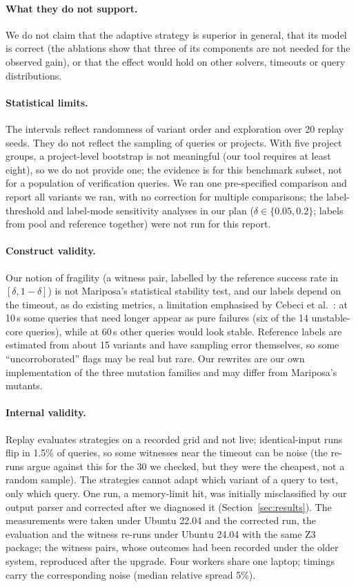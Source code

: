 \documentclass[11pt]{article}
\begin{document}
\paragraph{What they do not support.} We do not claim that the adaptive strategy is superior in general, that its model is correct (the ablations show that three of its components are not needed for the observed gain), or that the effect would hold on other solvers, timeouts or query distributions.

\paragraph{Statistical limits.} The intervals reflect randomness of variant order and exploration over 20 replay seeds. They do not reflect the sampling of queries or projects. With five project groups, a project-level bootstrap is not meaningful (our tool requires at least eight), so we do not provide one; the evidence is for this benchmark subset, not for a population of verification queries. We ran one pre-specified comparison and report all variants we ran, with no correction for multiple comparisons; the label-threshold and label-mode sensitivity analyses in our plan ($\delta\in\{0.05,0.2\}$; labels from pool and reference together) were not run for this report.

\paragraph{Construct validity.} Our notion of fragility (a witness pair, labelled by the reference success rate in $[\delta,1-\delta]$) is not Mariposa's statistical stability test, and our labels depend on the timeout, as do existing metrics, a limitation emphasised by Cebeci et al.~\cite{conjecture}: at 10\,s some queries that need longer appear as pure failures (six of the 14 unstable-core queries), while at 60\,s other queries would look stable. Reference labels are estimated from about 15 variants and have sampling error themselves, so some ``uncorroborated'' flags may be real but rare. Our rewrites are our own implementation of the three mutation families and may differ from Mariposa's mutants.

\paragraph{Internal validity.} Replay evaluates strategies on a recorded grid and not live; identical-input runs flip in 1.5\% of queries, so some witnesses near the timeout can be noise (the re-runs argue against this for the 30 we checked, but they were the cheapest, not a random sample). The strategies cannot adapt which variant of a query to test, only which query. One run, a memory-limit hit, was initially misclassified by our output parser and corrected after we diagnosed it (Section~\ref{sec:results}). The measurements were taken under Ubuntu 22.04 and the corrected run, the evaluation and the witness re-runs under Ubuntu 24.04 with the same Z3 package; the witness pairs, whose outcomes had been recorded under the older system, reproduced after the upgrade. Four workers share one laptop; timings carry the corresponding noise (median relative spread 5\%).
\end{document}
